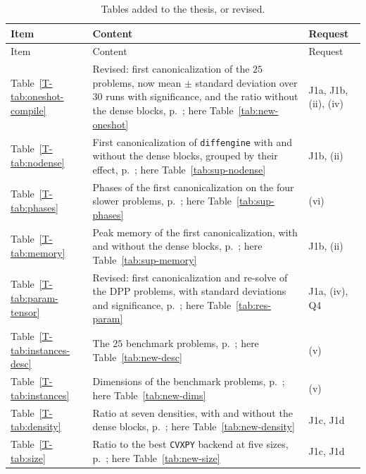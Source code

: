 \documentclass[letterpaper,12pt]{article}
\newcommand{\ac}[1]{#1}
\newcommand{\tpage}[1]{p.~\pageref{T-#1}}
\begin{document}
{\small
\begin{longtable}{>{\raggedright}p{} >{\raggedright}p{}
  >{\raggedright\arraybackslash}p{}}
\caption{Tables added to the thesis, or revised.}\label{tab:new-items}\\
\toprule
Item & Content & Request \\
\midrule
\endfirsthead
\toprule
Item & Content & Request \\
\midrule
\endhead
\bottomrule
\endfoot
Table~\ref{T-tab:oneshot-compile}
  & Revised: first canonicalization of the $25$ problems, now mean $\pm$ standard deviation over
    $30$ runs with significance, and the ratio without the dense blocks,
    \tpage{tab:oneshot-compile}; here Table~\ref{tab:new-oneshot}
  & J1a, J1b, (ii), (iv) \\
Table~\ref{T-tab:nodense}
  & First canonicalization of \texttt{diffengine} with and without the dense blocks, grouped by
    their effect, \tpage{tab:nodense}; here Table~\ref{tab:sup-nodense}
  & J1b, (ii) \\
Table~\ref{T-tab:phases}
  & Phases of the first canonicalization on the four slower problems, \tpage{tab:phases}; here
    Table~\ref{tab:sup-phases}
  & (vi) \\
Table~\ref{T-tab:memory}
  & Peak memory of the first canonicalization, with and without the dense blocks,
    \tpage{tab:memory}; here Table~\ref{tab:sup-memory}
  & J1b, (ii) \\
Table~\ref{T-tab:param-tensor}
  & Revised: first canonicalization and re-solve of the \ac{DPP} problems, with standard
    deviations and significance,
    \tpage{tab:param-tensor}; here Table~\ref{tab:res-param}
  & J1a, (iv), Q4 \\
Table~\ref{T-tab:instances-desc}
  & The $25$ benchmark problems, \tpage{tab:instances-desc}; here Table~\ref{tab:new-desc}
  & (v) \\
Table~\ref{T-tab:instances}
  & Dimensions of the benchmark problems, \tpage{tab:instances}; here Table~\ref{tab:new-dims}
  & (v) \\
Table~\ref{T-tab:density}
  & Ratio at seven densities, with and without the dense blocks, \tpage{tab:density}; here
    Table~\ref{tab:new-density}
  & J1c, J1d \\
Table~\ref{T-tab:size}
  & Ratio to the best \texttt{CVXPY} backend at five sizes, \tpage{tab:size}; here
    Table~\ref{tab:new-size}
  & J1c, J1d \\
\end{longtable}}
\end{document}
